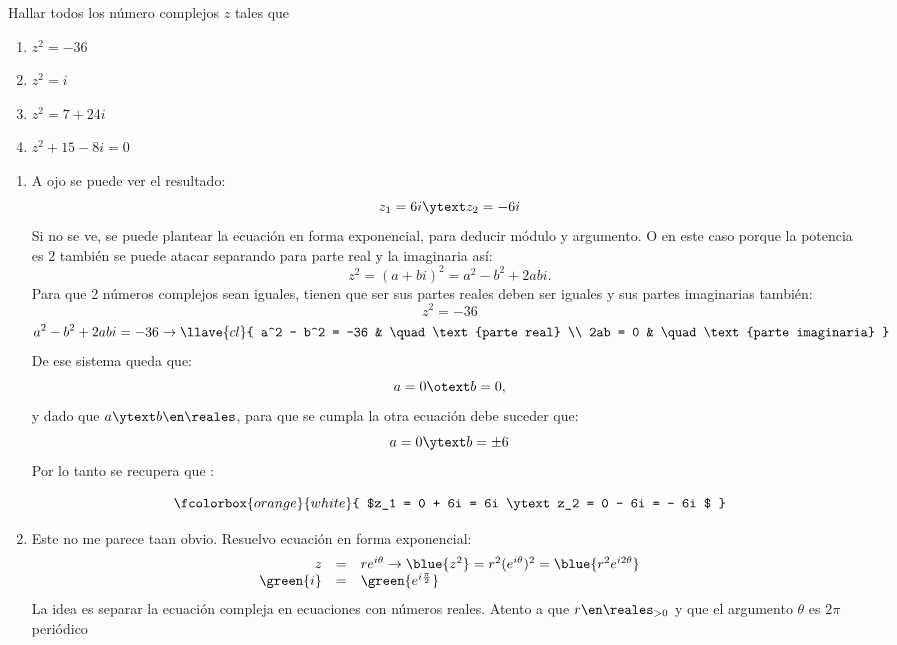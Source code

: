 \begin{enunciado}{\ejercicio}
  Hallar todos los número complejos $z$ tales que
  \begin{multicols}{4}
    \begin{enumerate}[label=\roman*)]
      \item $z^2 = -36$
      \item $z^2 = i$
      \item $z^2 = 7+24i$
      \item $z^2 + 15 -8i = 0$
    \end{enumerate}
  \end{multicols}
\end{enunciado}

\begin{enumerate}[label=\roman*)]
  \item\label{ej-3-item-i} A ojo se puede ver el resultado:
        $$
          z_1 = 6i \ytext z_2 = -6i
        $$
        Si no se ve, se puede plantear la ecuación en forma exponencial, para deducir módulo y argumento.
        O en este caso porque la potencia es 2 también se puede atacar separando para parte real y la imaginaria así:
        $$
          z^2 = (a+bi)^2 = a^2-b^2 + 2abi.
        $$
        Para que 2 números complejos sean iguales, tienen que ser sus partes reales deben ser iguales y sus partes imaginarias también:
        $$
          z^2 = -36
        $$
        $$
          a^2-b^2 + 2abi = - 36
          \to
          \llave{cl}{
            a^2 - b^2 = -36 & \quad \text{parte real}       \\
            2ab = 0         & \quad \text{parte imaginaria}
          }
        $$
        De ese sistema queda que:
        $$
          a = 0 \otext b = 0,
        $$
        y dado que $a\ytext b \en \reales$, para que se cumpla la otra ecuación debe suceder que:
        $$
          a = 0 \ytext b = \pm6
        $$
        Por lo tanto se recupera que :

        $$
          \fcolorbox{orange}{white}{
            $z_1 = 0 + 6i = 6i
              \ytext
              z_2 = 0 - 6i = - 6i
            $
          }
        $$

  \item Este no me parece taan obvio. Resuelvo ecuación en forma exponencial:
        $$
          \begin{array}{rcl}
            z         & = & r e^{i \theta} \to \blue{z^2} = r^2 (e^{i \theta})^2 = \blue{r^2 e^{i 2\theta}} \\
            \green{i} & = & \green{e^{i \frac{\pi}{2}}}
          \end{array}
        $$
        La idea es separar la ecuación compleja en  ecuaciones con números reales. Atento a que $r \en \reales_{>0}$
        y que el argumento $\theta$ es $2\pi$ periódico\red{!}


\end{enumerate}
